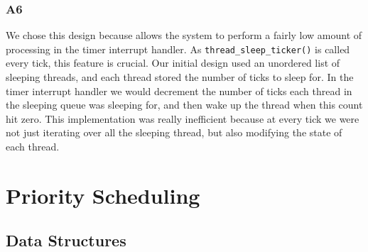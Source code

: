 \documentclass[a4wide, 11pt]{article}
\newcommand{\tx}{\texttt}
\begin{document}
\subsubsection{A6}
We chose this design because allows the system to perform a fairly low amount of processing in the timer interrupt handler. As \tx{thread\_sleep\_ticker()} is called every tick, this feature is crucial. Our initial design used an unordered list of sleeping threads, and each thread stored the number of ticks to sleep for. In the timer interrupt handler we would decrement the number of ticks each thread in the sleeping queue was sleeping for, and then wake up the thread when this count hit zero. This implementation was really inefficient because at every tick we were not just iterating over all the sleeping thread, but also modifying the state of each thread.

\section{Priority Scheduling}
\subsection{Data Structures}
\end{document}

